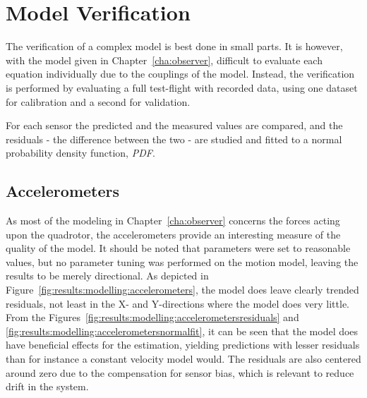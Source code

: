 \section{Model Verification}
\label{sec:results:modelling}
    The verification of a complex model is best done in small parts.
    It is however, with the model given in Chapter~\ref{cha:observer},
    difficult to evaluate each equation individually due to the couplings of the model.
    Instead, the verification is performed by evaluating a full test-flight
    with recorded data, using one dataset for calibration and a second for validation.

    For each sensor the predicted and the measured values are compared,
    and the residuals - the difference between the two - are studied and
    fitted to a normal probability density function, \textit{PDF}.

    \subsection{Accelerometers}
        \label{ssec:results:modelling:accelerometers}
        As most of the modeling in Chapter~\ref{cha:observer} concerns
        the forces acting upon the quadrotor, the accelerometers
        provide an interesting measure of the quality of the model.
        It should be noted that parameters were set to reasonable values,
        but no parameter tuning was performed on the motion model,
        leaving the results to be merely directional.
        As depicted in Figure~\ref{fig:results:modelling:accelerometers},
        the model does leave clearly trended residuals, not least in the
        X- and Y-directions where the model does very little.
        From the Figures~\ref{fig:results:modelling:accelerometersresiduals} and \ref{fig:results:modelling:accelerometersnormalfit},
        it can be seen that the model does have beneficial
        effects for the estimation, yielding predictions with lesser residuals
        than for instance a constant velocity model would.
        The residuals are also centered around zero due to the compensation
        for sensor bias, which is relevant to reduce drift in the system.

